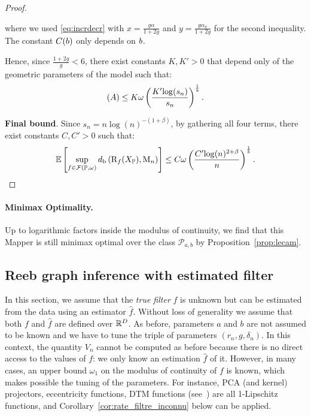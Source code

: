 \begin{proof}
\begin{itemize}
where we used \eqref{eq:incrdecr} with $x = \frac{g\alpha}{1+2g}$ and $y=\frac{g\alpha_n}{1+2g}$ for the second inequality.
The constant $C(b)$  only  depends on $b$.

Hence, since $\frac{1+2g}{g} < 6$, there exist constants $K,K'>0$ that depend only of the geometric parameters of the model such that:
$$(A)\leq  K\omega %
\left(\frac{K'{\log}(s_n)}{s_n}\right)^{\frac1\dimension}. $$ %


\end{itemize}

{\bf Final bound}.
Since $s_n = n{\log}(n)^{-(1+\beta)}$, by gathering all four terms, 
there exist constants $C,C'>0$ such that:
$$\mathbb{E}\left[\sup_{f \in \mathcal F(\p,\omega)} \dper\left(\Reeb_f(\Xset_\p),\Map_n\right)\right]\leq 
C\omega%
\left(\frac{C'{\log}(n)^{2+\beta}}{n}\right)^{\frac1\dimension}. $$ %
\end{proof}

\paragraph*{Minimax Optimality.}
Up to logarithmic factors inside the modulus of continuity, 
we find that this Mapper is still minimax optimal over the class $\mathcal P_{a,b}$ by Proposition~\ref{prop:lecam}.


\subsection{Reeb graph inference with estimated filter } %
\label{subsec:estimator}



In this section, we
assume that the {\em true filter} $f$ is unknown but can be estimated
from the data using an estimator $\hat f$. Without loss of generality  we assume that both $f$ and $\hat f$ are defined over $\mathbb{R}^D$.
As before, parameters $a$ and
$b$ are not assumed to be known and we have to tune the triple of
parameters $(r_n,g,\delta_n)$.
In this context, the quantity $V_n$ cannot be computed as before because there is no direct access to the values of $f$: we 
only know an estimation $\hat f$ of it. 
However, in many cases, an upper bound $\omega_1$ on the modulus of continuity of $f$ is known, which makes possible the 
tuning of the parameters. For instance, PCA (and kernel) projectors, eccentricity functions, DTM functions 
(see~\cite{Chazal11}) are all 1-Lipschitz functions, and Corollary~\ref{cor:rate_filtre_inconnu} below can be applied.



